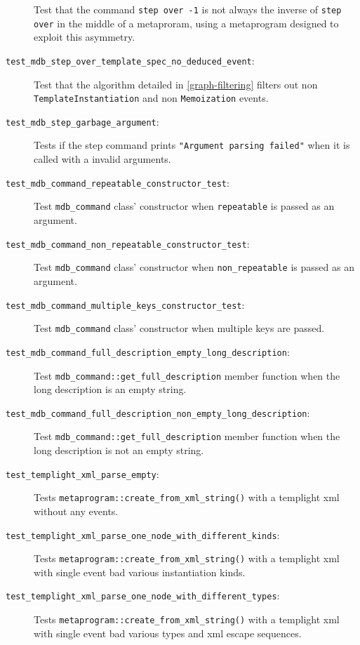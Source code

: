 \begin{description}
        Test that the command \texttt{step over -1} is not always the inverse
        of \texttt{step over} in the middle of a metaproram, using a
        metaprogram designed to exploit this asymmetry.
    \item[\texttt{test\_mdb\_step\_over\_template\_spec\_no\_deduced\_event}:]
        Test that the algorithm detailed in \ref{graph-filtering} filters out
        non \texttt{TemplateInstantiation} and non \texttt{Memoization} events.
    \item[\texttt{test\_mdb\_step\_garbage\_argument}:]
        Tests if the step command prints
        \texttt{"Argument parsing failed"} when it is called with a invalid
        arguments.
    \item[\texttt{test\_mdb\_command\_repeatable\_constructor\_test}:]
        Test \texttt{mdb\_command} class' constructor when \texttt{repeatable}
        is passed as an argument.
    \item[\texttt{test\_mdb\_command\_non\_repeatable\_constructor\_test}:]
        Test \texttt{mdb\_command} class' constructor when
        \texttt{non\_repeatable} is passed as an argument.
    \item[\texttt{test\_mdb\_command\_multiple\_keys\_constructor\_test}:]
        Test \texttt{mdb\_command} class' constructor when multiple keys are
        passed.
    \item[\texttt{test\_mdb\_command\_full\_description\_empty\_long\_description}:]
        Test \texttt{mdb\_command::get\_full\_description} member function when
        the long description is an empty string.
    \item[\texttt{test\_mdb\_command\_full\_description\_non\_empty\_long\_description}:]
        Test \texttt{mdb\_command::get\_full\_description} member function when
        the long description is not an empty string.
    \item[\texttt{test\_templight\_xml\_parse\_empty}:]
        Tests \texttt{metaprogram::create\_from\_xml\_string()} with a templight
        xml without any events.
    \item[\texttt{test\_templight\_xml\_parse\_one\_node\_with\_different\_kinds}:]
        Tests \texttt{metaprogram::create\_from\_xml\_string()} with a templight
        xml with single event bad various instantiation kinds.
    \item[\texttt{test\_templight\_xml\_parse\_one\_node\_with\_different\_types}:]
        Tests \texttt{metaprogram::create\_from\_xml\_string()} with a templight
        xml with single event bad various types and xml escape sequences.

\end{description}
